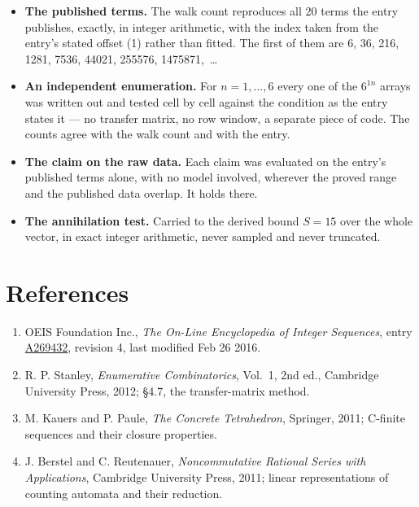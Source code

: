 \documentclass[11pt]{article}
\theoremstyle{definition}
\begin{document}
\begin{itemize}

\item {\bfseries The published terms.} The walk count reproduces all 20 terms the entry publishes, exactly, in integer arithmetic, with the index taken from the entry's stated offset (1) rather than fitted. The first of them are 6, 36, 216, 1281, 7536, 44021, 255576, 1475871,~\dots

\item {\bfseries An independent enumeration.} For $n = 1,\dots,6$ every one of the $6^{1n}$ arrays was written out and tested cell by cell against the condition as the entry states it --- no transfer matrix, no row window, a separate piece of code. The counts agree with the walk count and with the entry.

\item {\bfseries The claim on the raw data.} Each claim was evaluated on the entry's published terms alone, with no model involved, wherever the proved range and the published data overlap. It holds there.

\item {\bfseries The annihilation test.} Carried to the derived bound $S = 15$ over the whole vector, in exact integer arithmetic, never sampled and never truncated.

\end{itemize}

\section{References}

\begin{enumerate}

\item OEIS Foundation Inc., \emph{The On-Line Encyclopedia of Integer Sequences}, entry \href{https://oeis.org/A269432}{A269432}, revision 4, last modified Feb 26 2016.

\item R. P. Stanley, \emph{Enumerative Combinatorics}, Vol.~1, 2nd ed., Cambridge University Press, 2012; \S4.7, the transfer-matrix method.

\item M. Kauers and P. Paule, \emph{The Concrete Tetrahedron}, Springer, 2011; C-finite sequences and their closure properties.

\item J. Berstel and C. Reutenauer, \emph{Noncommutative Rational Series with Applications}, Cambridge University Press, 2011; linear representations of counting automata and their reduction.

\end{enumerate}
\end{document}
